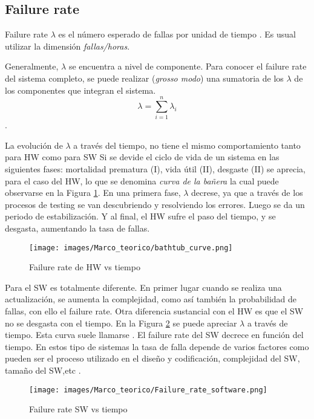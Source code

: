 \subsection{Failure rate}
Failure rate $\lambda$ es el número esperado de fallas por unidad de tiempo \citep{FTDesign}. Es
usual utilizar la dimensión \textit{fallas/horas}.

Generalmente, $\lambda$ se encuentra a nivel de componente. Para conocer el failure rate del
sistema completo, se puede realizar (\textit{grosso modo}) una sumatoria de los $\lambda$ de los
componentes que integran el sistema. $$\lambda=\sum_{i=1}^{n} \lambda_i$$.

La evolución de $\lambda$ a través del tiempo, no tiene el mismo comportamiento tanto para \ac{HW} como para \ac{SW}
Si se devide el ciclo de vida de un sistema en las siguientes fases: mortalidad prematura (I), vida útil (II), desgaste (II) \citep{FTDesign}
se aprecia, para el caso del \ac{HW}, lo que se denomina \textit{curva de la bañera} la cual puede observarse en la Figura \ref{fig:bathtub_curve}.
En una primera fase, $\lambda$ decrese, ya que a través de los procesos de testing se van descubriendo y resolviendo los errores. Luego se da un periodo de estabilización.
Y al final, el \ac{HW} sufre el paso del tiempo, y se desgasta, aumentando la tasa de fallas.

\begin{figure}[h]
 \centering
 \texttt{[image: images/Marco\_teorico/bathtub\_curve.png]}
  \caption{Failure rate de HW vs tiempo }
\label{fig:bathtub_curve}
\end{figure}

Para el \ac{SW} es totalmente diferente. En primer lugar cuando se realiza una actualización, se aumenta la complejidad, como así también la probabilidad de fallas,
con ello el failure rate. Otra diferencia sustancial con el \ac{HW} es que el \ac{SW} no se desgasta con el tiempo. En la Figura \ref{fig:Failure_rate_software}
se puede apreciar $\lambda$ a través de tiempo. Esta curva suele llamarse . El failure rate del \ac{SW} decrece en función del tiempo. En estos tipo de sistemas
la tasa de falla depende de varios factores como pueden ser el proceso utilizado en el diseño y codificación, complejidad del \ac{SW}, tamaño del \ac{SW},etc \citep{FTDesign}.

\begin{figure}[h]
 \centering
 \texttt{[image: images/Marco\_teorico/Failure\_rate\_software.png]}
  \caption{Failure rate SW vs tiempo }
\label{fig:Failure_rate_software}
\end{figure}


